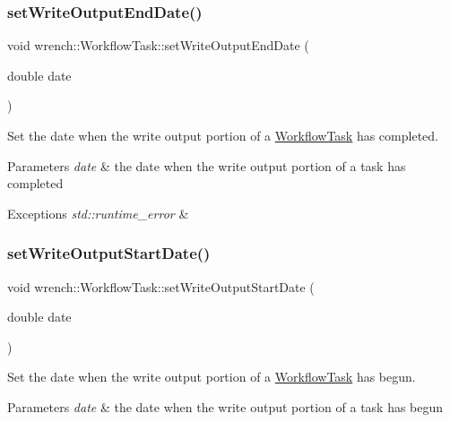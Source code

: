 \subsubsection{\texorpdfstring{set\+Write\+Output\+End\+Date()}{setWriteOutputEndDate()}}
{\footnotesize\ttfamily void wrench\+::\+Workflow\+Task\+::set\+Write\+Output\+End\+Date (\begin{DoxyParamCaption}\item[{double}]{date }\end{DoxyParamCaption})}



Set the date when the write output portion of a \hyperlink{classwrench_1_1_workflow_task}{Workflow\+Task} has completed. 


\begin{DoxyParams}{Parameters}
{\em date} & the date when the write output portion of a task has completed \\
\hline
\end{DoxyParams}

\begin{DoxyExceptions}{Exceptions}
{\em std\+::runtime\+\_\+error} & \\
\hline
\end{DoxyExceptions}
\mbox{\label{classwrench_1_1_workflow_task_a6ab325eecb0736fbb90be1143440b18f}} 
\subsubsection{\texorpdfstring{set\+Write\+Output\+Start\+Date()}{setWriteOutputStartDate()}}
{\footnotesize\ttfamily void wrench\+::\+Workflow\+Task\+::set\+Write\+Output\+Start\+Date (\begin{DoxyParamCaption}\item[{double}]{date }\end{DoxyParamCaption})}



Set the date when the write output portion of a \hyperlink{classwrench_1_1_workflow_task}{Workflow\+Task} has begun. 


\begin{DoxyParams}{Parameters}
{\em date} & the date when the write output portion of a task has begun \\
\hline
\end{DoxyParams}

